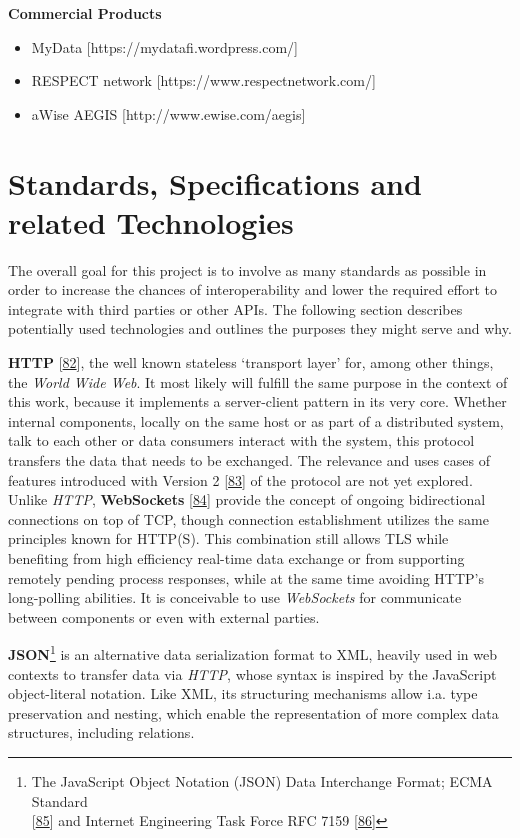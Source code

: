 \documentclass[12pt,english,a4paper,titlepage,cleardoublepage=empty,dottedtoc]{report}
\providecommand{\tightlist}{%
  \setlength{\itemsep}{0pt}\setlength{\parskip}{0pt}}
\begin{document}
\textbf{Commercial Products}

\begin{itemize}
\tightlist
\item
  MyData {[}https://mydatafi.wordpress.com/{]}
\item
  RESPECT network {[}https://www.respectnetwork.com/{]}
\item
  aWise AEGIS {[}http://www.ewise.com/aegis{]}
\end{itemize}

\hypertarget{standards-specifications-and-related-technologies}{\section{Standards,
Specifications and related
Technologies}\label{standards-specifications-and-related-technologies}}

The overall goal for this project is to involve as many standards as
possible in order to increase the chances of interoperability and lower
the required effort to integrate with third parties or other APIs. The
following section describes potentially used technologies and outlines
the purposes they might serve and why.

\textbf{\protect\hypertarget{def--http}{}{HTTP}}
{[}\protect\hyperlink{ref-web_spec_http1}{82}{]}, the well known
stateless `transport layer' for, among other things, the \emph{World
Wide Web}. It most likely will fulfill the same purpose in the context
of this work, because it implements a server-client pattern in its very
core. Whether internal components, locally on the same host or as part
of a distributed system, talk to each other or data consumers interact
with the system, this protocol transfers the data that needs to be
exchanged. The relevance and uses cases of features introduced with
Version 2 {[}\protect\hyperlink{ref-web_spec_http2}{83}{]} of the
protocol are not yet explored. Unlike \emph{HTTP}, \textbf{WebSockets}
{[}\protect\hyperlink{ref-web_spec_websockets}{84}{]} provide the
concept of ongoing bidirectional connections on top of TCP, though
connection establishment utilizes the same principles known for HTTP(S).
This combination still allows TLS while benefiting from high efficiency
real-time data exchange or from supporting remotely pending process
responses, while at the same time avoiding HTTP's long-polling
abilities. It is conceivable to use \emph{WebSockets} for communicate
between components or even with external parties.

\textbf{JSON}\footnote{The JavaScript Object Notation (JSON) Data
  Interchange Format; ECMA Standard\\
  {[}\protect\hyperlink{ref-web_spec_json}{85}{]} and Internet
  Engineering Task Force RFC 7159
  {[}\protect\hyperlink{ref-web_rfc_json}{86}{]}} is an alternative data
serialization format to XML, heavily used in web contexts to transfer
data via \emph{HTTP}, whose syntax is inspired by the JavaScript
object-literal notation. Like XML, its structuring mechanisms allow i.a.
type preservation and nesting, which enable the representation of more
complex data structures, including relations.
\end{document}
